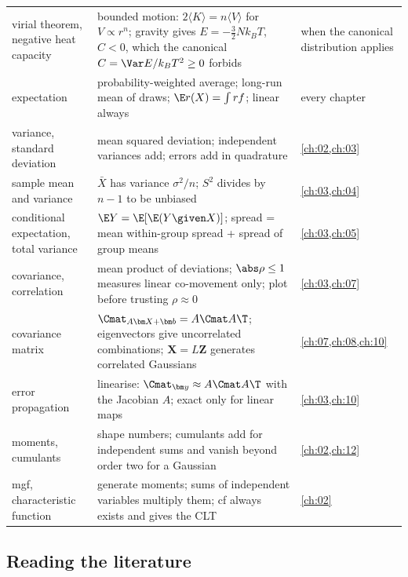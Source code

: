 \begin{center}
\begin{tabularx}{\linewidth}{@{}>{\raggedright\arraybackslash}p{3.3cm}
                               >{\raggedright\arraybackslash}X
                               >{\raggedright\arraybackslash}p{2.7cm}@{}}
virial theorem, negative heat capacity & bounded motion: $2\langle K\rangle=n\langle V\rangle$
  for $V\propto r^n$; gravity gives $E=-\frac32Nk_BT$, $C<0$, which the canonical
  $C=\Var E/k_BT^2\ge0$ forbids & when the canonical distribution applies\\
expectation & probability-weighted average; long-run mean of draws;
  $\E r(X)=\int rf$; linear always & every chapter\\
variance, standard deviation & mean squared deviation; independent variances
  add; errors add in quadrature & \cref{ch:02,ch:03}\\
sample mean and variance & $\bar X$ has variance $\sigma^2/n$; $S^2$
  divides by $n-1$ to be unbiased & \cref{ch:03,ch:04}\\
conditional expectation, total variance & $\E Y=\E[\E(Y\given X)]$;
  spread = mean within-group spread + spread of group means &
  \cref{ch:03,ch:05}\\
covariance, correlation & mean product of deviations; $\abs\rho\le1$
  measures linear co-movement only; plot before trusting $\rho\approx0$ &
  \cref{ch:03,ch:07}\\
covariance matrix & $\Cmat_{A\bm X+\bm b}=A\Cmat A\T$; eigenvectors give
  uncorrelated combinations; $\bm X=L\bm Z$ generates correlated Gaussians &
  \cref{ch:07,ch:08,ch:10}\\
error propagation & linearise: $\Cmat_{\bm y}\approx A\Cmat A\T$ with the
  Jacobian $A$; exact only for linear maps & \cref{ch:03,ch:10}\\
moments, cumulants & shape numbers; cumulants add for independent sums and
  vanish beyond order two for a Gaussian & \cref{ch:02,ch:12}\\
mgf, characteristic function & generate moments; sums of independent
  variables multiply them; cf always exists and gives the CLT &
  \cref{ch:02}\\
\bottomrule
\end{tabularx}
\end{center}

\subsection*{Reading the literature}

